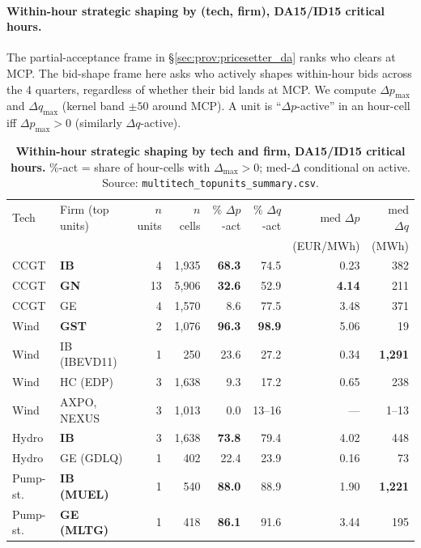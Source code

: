 \documentclass[11pt,a4paper]{article}
\newcommand{\code}[1]{\nolinkurl{#1}}
\begin{document}
\paragraph{Within-hour strategic shaping by (tech, firm), DA15/ID15 critical hours.} The partial-acceptance frame in \S\ref{sec:prov:pricesetter_da} ranks who clears at MCP. The bid-shape frame here asks who actively shapes within-hour bids across the 4 quarters, regardless of whether their bid lands at MCP. We compute $\Delta p_{\max}$ and $\Delta q_{\max}$ (kernel band $\pm 50$ around MCP). A unit is ``$\Delta p$-active'' in an hour-cell iff $\Delta p_{\max} > 0$ (similarly $\Delta q$-active).

\begin{table}[H]
\centering\scriptsize
\caption{\textbf{Within-hour strategic shaping by tech and firm, DA15/ID15 critical hours.} \%-act = share of hour-cells with $\Delta_{\max} > 0$; med-$\Delta$ conditional on active. Source: \code{multitech_topunits_summary.csv}.}
\label{tab:within_hour_shaping}
\setlength{\tabcolsep}{3pt}
\begin{tabular}{@{}l l r r r r r r@{}}
\toprule
Tech & Firm (top units) & $n$ units & $n$ cells & \% $\Delta p$-act & \% $\Delta q$-act & med $\Delta p$ & med $\Delta q$ \\
     &                  &          &           &                   &                   & (EUR/MWh)      & (MWh)         \\
\midrule
CCGT       & \textbf{IB}              &  4 & 1{,}935 & \textbf{68.3} & 74.5 & 0.23 &   382 \\
CCGT       & \textbf{GN}              & 13 & 5{,}906 & \textbf{32.6} & 52.9 & \textbf{4.14} & 211 \\
CCGT       & GE                       &  4 & 1{,}570 &  8.6 & 77.5 & 3.48 &   371 \\
\midrule
Wind       & \textbf{GST}             &  2 & 1{,}076 & \textbf{96.3} & \textbf{98.9} & 5.06 &    19 \\
Wind       & IB (IBEVD11)             &  1 &    250 & 23.6 & 27.2 & 0.34 & \textbf{1{,}291} \\
Wind       & HC (EDP)                 &  3 & 1{,}638 &  9.3 & 17.2 & 0.65 &   238 \\
Wind       & AXPO, NEXUS              &  3 & 1{,}013 &  0.0 & 13--16 & --- & 1--13 \\
\midrule
Hydro      & \textbf{IB}              & 3 & 1{,}638 & \textbf{73.8} & 79.4 & 4.02 &   448 \\
Hydro      & GE (GDLQ)                &  1 &    402 & 22.4 & 23.9 & 0.16 &    73 \\
\midrule
Pump-st.   & \textbf{IB (MUEL)}       &  1 &    540 & \textbf{88.0} & 88.9 & 1.90 & \textbf{1{,}221} \\
Pump-st.   & \textbf{GE (MLTG)}       &  1 &    418 & \textbf{86.1} & 91.6 & 3.44 &   195 \\
\bottomrule
\end{tabular}
\end{table}
\end{document}
